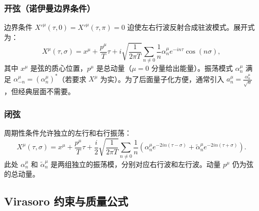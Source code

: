 \subsubsection*{开弦（诺伊曼边界条件）}
边界条件 $X'^\mu(\tau,0)=X'^\mu(\tau,\pi)=0$ 迫使左右行波反射合成驻波模式。展开式为：
\begin{equation}
X^\mu(\tau,\sigma) = x^\mu + \frac{p^\mu}{T} \tau + i \sqrt{\frac{1}{2\pi T}} \sum_{n\neq 0} \frac{1}{n} \alpha_n^\mu e^{-in\tau} \cos(n\sigma),
\end{equation}
其中 $x^\mu$ 是弦的质心位置，$p^\mu$ 是总动量（$\mu=0$ 分量给出能量）。振荡模式 $\alpha_n^\mu$ 满足 $\alpha_{-n}^\mu = (\alpha_n^\mu)^*$（若要求 $X^\mu$ 为实）。为了后面量子化方便，通常引入 $a_n^\mu = \frac{\alpha_n^\mu}{\sqrt{n}}$，但经典层面不需要。

\subsubsection*{闭弦}
周期性条件允许独立的左行和右行振荡：
\begin{equation}
X^\mu(\tau,\sigma) = x^\mu + \frac{p^\mu}{T} \tau + \frac{i}{2} \sqrt{\frac{1}{2\pi T}} \sum_{n\neq 0} \frac{1}{n} \left( \alpha_n^\mu e^{-2in(\tau-\sigma)} + \tilde{\alpha}_n^\mu e^{-2in(\tau+\sigma)} \right).
\end{equation}
此处 $\alpha_n^\mu$ 和 $\tilde{\alpha}_n^\mu$ 是两组独立的振荡模，分别对应右行波和左行波。动量 $p^\mu$ 仍为弦的总动量。

\subsection*{Virasoro 约束与质量公式}

